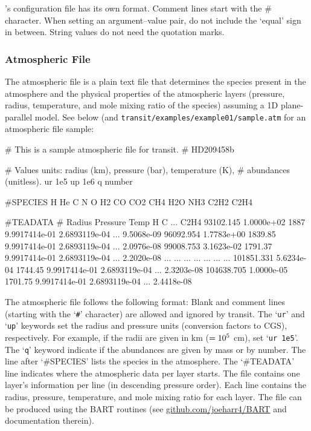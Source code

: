 \documentclass[letterpaper, 12pt]{article}
\begin{document}
{\transit}'s configuration file has its own format.  Comment lines
start with the {\tttm \#} character.  When setting an argument--value
pair, do not include the `equal' sign in between.  String values do
not need the quotation marks.

\subsubsection{Atmospheric File}
\label{atm-file}

The atmospheric file is a plain text file that determines the species
present in the atmosphere and the physical properties of the
atmospheric layers (pressure, radius, temperature, and mole mixing
ratio of the species) assuming a 1D plane-parallel model.  See below
(and {\tt transit/examples/example01/sample.atm}  for an atmospheric file sample: \newline

\begin{plain}
# This is a sample atmospheric file for transit.
# HD209458b

# Values units: radius (km), pressure (bar), temperature (K),
#               abundances (unitless).
ur 1e5
up 1e6
q number

#SPECIES
H He C N O H2 CO CO2 CH4 H2O NH3 C2H2 C2H4

#TEADATA
# Radius    Pressure    Temp     H              C              ...  C2H4
 93102.145  1.0000e+02  1887     9.9917414e-01  2.6893119e-04  ...  9.5068e-09
 96092.954  1.7783e+00  1839.85  9.9917414e-01  2.6893119e-04  ...  2.0976e-08
 99008.753  3.1623e-02  1791.37  9.9917414e-01  2.6893119e-04  ...  2.2020e-08
       ...  ...         ...      ...            ...            ...  ...     
101851.331  5.6234e-04  1744.45  9.9917414e-01  2.6893119e-04  ...  2.3203e-08
104638.705  1.0000e-05  1701.75  9.9917414e-01  2.6893119e-04  ...  2.4418e-08
\end{plain}

The atmospheric file follows the following format: Blank and comment
lines (starting with the `{\tt \#}' character) are allowed and ignored
by transit.  The `{\tt ur}' and `{\tt up}' keywords set the radius and
pressure units (conversion factors to CGS), respectively.  For
example, if the radii are given in km ($=10\sp{5}$ cm), set `{\tt ur
  1e5}'.  The `{\tt q}' keyword indicate if the abundances are given
by mass or by number.  The line after `{\tttm\#SPECIES}' lists the
species in the atmosphere.  The `{\tttm\#TEADATA}' line indicates where the
atmospheric data per layer starts.  The file contains one layer's information
per line (in descending pressure order).  Each line contains the
radius, pressure, temperature, and mole mixing ratio for each layer.
The file can be produced using the BART routines (see
\href{https://github.com/joeharr4/BART}{github.com/joeharr4/BART} and
documentation therein).
\end{document}
